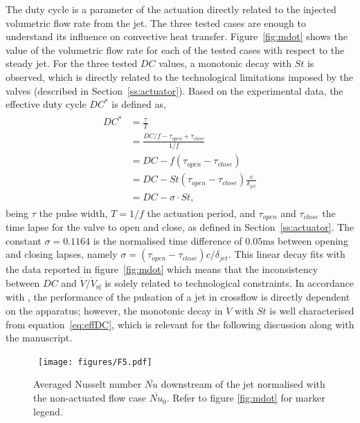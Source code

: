 The duty cycle is a parameter of the actuation directly related to the injected volumetric flow rate from the jet. The three tested cases are enough to understand its influence on convective heat transfer. Figure~\ref{fig:mdot} shows the value of the volumetric flow rate for each of the tested cases with respect to the steady jet. For the three tested $DC$ values, a monotonic decay with $St$ is observed, which is directly related to the technological limitations imposed by the valves (described in Section~\ref{ss:actuator}). Based on the experimental data, the effective duty cycle $DC^*$ is defined as, 
%
\begin{align}\label{eq:effDC}
\begin{split}
    DC^* & =\frac{\tau}{T}\\
         & = \frac{DC/f-\tau_{open}+\tau_{close}}{1/f}\\
         & = DC -f \left(\tau_{open}-\tau_{close}\right) \\
         & = DC -St \left(\tau_{open}-\tau_{close}\right)\frac{c}{\delta_{jet}} \\
         & = DC - \sigma \cdot St,
\end{split}
\end{align}
%
being $\tau$ the pulse width, $T = 1/f$ the actuation period, and $\tau_{open}$ and $\tau_{close}$ the time lapse for the valve to open and close, as defined in Section~\ref{ss:actuator}. The constant $\sigma = 0.1164$ is the normalised time difference of $0.05\mathrm{ms}$ between opening and closing lapses, namely $\sigma = (\tau_{open}-\tau_{close})c/\delta_{jet}$. This linear decay fits with the data reported in figure~\ref{fig:mdot} which means that the inconsistency between $DC$ and $\dot{V}/\dot{V}_{\mathrm{sj}}$ is solely related to technological constraints. In accordance with \citet{MCLOSKEY2002}, the performance of the pulsation of a jet in crossflow is directly dependent on the apparatus; however, the monotonic decay in $\dot{V}$ with $St$ is well characterised from equation~\ref{eq:effDC}, which is relevant for the following discussion along with the manuscript.

\begin{figure}[] %
    \centering\
    \texttt{[image: figures/F5.pdf]}
    \caption{Averaged Nusselt number $\overline{Nu}$ downstream of the jet normalised with the non-actuated flow case $\overline{Nu}_0$. Refer to figure \ref{fig:mdot} for marker legend.}
    \label{fig:Num}
\end{figure}

